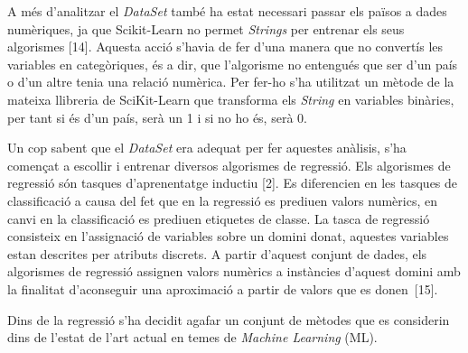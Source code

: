 \documentclass[10pt,a4paper,twocolumn,twoside]{article}
\begin{document}
A més d'analitzar el \textit{DataSet} també ha estat necessari passar els països a dades numèriques, ja que Scikit-Learn no permet \textit{Strings} per entrenar els seus algorismes [14]. Aquesta acció s'havia de fer d'una manera que no convertís les variables en categòriques, és a dir, que l'algorisme no entengués que ser d'un país o d'un altre tenia una relació numèrica. Per fer-ho s'ha utilitzat un mètode de la mateixa llibreria de SciKit-Learn que transforma els \textit{String} en variables binàries, per tant si és d'un país, serà un 1 i si no ho és, serà 0.

Un cop sabent que el \textit{DataSet} era adequat per fer aquestes anàlisis, s'ha començat a escollir i entrenar diversos algorismes de regressió. Els algorismes de regressió són tasques d'aprenentatge inductiu [2]. Es diferencien en les tasques de classificació a causa del fet que en la regressió es prediuen valors numèrics, en canvi en la classificació es prediuen etiquetes de classe. La tasca de regressió consisteix en l'assignació de variables sobre un domini donat, aquestes variables estan descrites per atributs discrets. A partir d'aquest conjunt de dades, els algorismes de regressió assignen valors numèrics a instàncies d'aquest domini amb la finalitat d'aconseguir una aproximació a partir de valors que es donen~[15].

Dins de la regressió s'ha decidit agafar un conjunt de mètodes que es considerin dins de l'estat de l'art actual en temes de \textit{Machine Learning} (ML).
\end{document}
